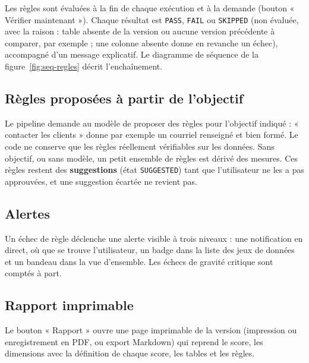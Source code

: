 Les règles sont évaluées à la fin de chaque exécution et à la demande (bouton « Vérifier maintenant »). Chaque résultat est \texttt{PASS}, \texttt{FAIL} ou \texttt{SKIPPED} (non évaluée, avec la raison : table absente de la version ou aucune version précédente à comparer, par exemple ; une colonne absente donne en revanche un échec), accompagné d'un message explicatif. Le diagramme de séquence de la figure~\ref{fig:seq-regles} décrit l'enchaînement.


\subsection{Règles proposées à partir de l'objectif}

Le pipeline demande au modèle de proposer des règles pour l'objectif indiqué : « contacter les clients » donne par exemple un courriel renseigné et bien formé. Le code ne conserve que les règles réellement vérifiables sur les données. Sans objectif, ou sans modèle, un petit ensemble de règles est dérivé des mesures. Ces règles restent des \textbf{suggestions} (état \texttt{SUGGESTED}) tant que l'utilisateur ne les a pas approuvées, et une suggestion écartée ne revient pas.

\subsection{Alertes}

Un échec de règle déclenche une alerte visible à trois niveaux : une notification en direct, où que se trouve l'utilisateur, un badge dans la liste des jeux de données et un bandeau dans la vue d'ensemble. Les échecs de gravité critique sont comptés à part.


\subsection{Rapport imprimable}

Le bouton « Rapport » ouvre une page imprimable de la version (impression ou enregistrement en PDF, ou export Markdown) qui reprend le score, les dimensions avec la définition de chaque score, les tables et les règles.

